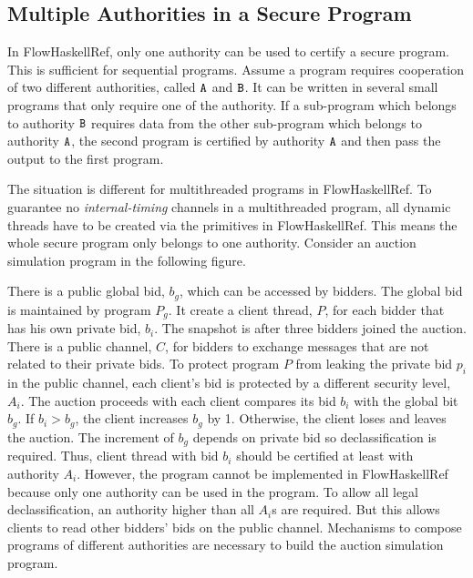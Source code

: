 \documentclass{report}
\newcommand{\co}[1]{$\cod{#1}$}
\begin{document}
\subsection{Multiple Authorities in a Secure Program}
In FlowHaskellRef, only one authority can be used to certify a secure program. This is sufficient for
sequential programs. Assume a program requires cooperation of two different authorities, 
called \co{A} and \co{B}. It can be written in several small programs that only require one of the authority.
If a sub-program which belongs to authority \co{B} requires data from the other sub-program which belongs to
authority \co{A}, the second program is certified by authority \co{A} and then pass the output to the
first program. 

The situation is different for multithreaded programs in FlowHaskellRef. To guarantee no {\em internal-timing}
channels in a multithreaded program, all dynamic threads have to be created via the primitives in 
FlowHaskellRef. This means the whole secure program only belongs to one authority. Consider an auction simulation
program in the following figure. 


There is a public global bid, $b_g$, which can be accessed by bidders. 
The global bid is maintained by program $P_g$. It create a client thread, $P$, for each 
bidder that has his own private bid, $b_i$.
The snapshot is after three bidders joined the auction. 
There is a public channel, $C$, for bidders to exchange messages that are not related to their private bids.
To protect program $P$ from leaking the private bid $p_i$ in the public channel, each client's bid is protected
by a different security level, $A_i$.  
The auction proceeds with each client compares its bid $b_i$ with the global bit $b_g$.
If $b_i>b_g$, the client increases $b_g$ by 1. Otherwise, the client loses and leaves the auction.
The increment of $b_g$ depends on private bid so declassification is required.
Thus, client thread with bid $b_i$ should be certified at least with authority $A_i$.
However, the program cannot be implemented in FlowHaskellRef because only one authority can be used in
the program. To allow all legal declassification, an authority higher than all $A_i$s are required.
But this allows clients to read other bidders' bids on the public channel.
Mechanisms to compose programs of different authorities are necessary to build the auction simulation program.
\end{document}
